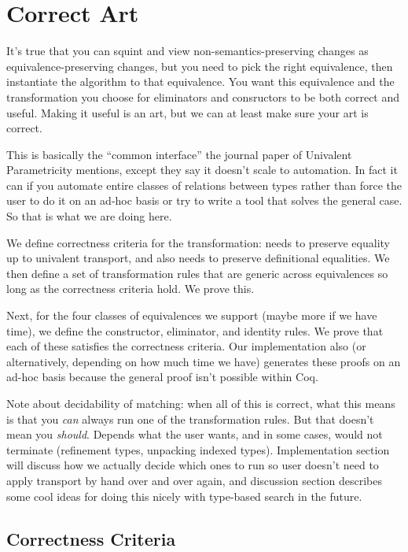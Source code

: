 \section{Correct Art}
\label{sec:meat}

It's true that you can squint and view non-semantics-preserving changes as equivalence-preserving changes,
but you need to pick the right equivalence, then instantiate the algorithm to that equivalence.
You want this equivalence and the transformation you choose for eliminators and consructors to be both correct and useful.
Making it useful is an art, but we can at least make sure your art is correct.

This is basically the ``common interface'' the journal paper of Univalent Parametricity mentions, except they say it
doesn't scale to automation. In fact it can if you automate entire classes of relations between types rather than
force the user to do it on an ad-hoc basis or try to write a tool that solves the general case. So that is what
we are doing here.

We define correctness criteria for the transformation: needs to preserve equality up to univalent transport, and also needs to
preserve definitional equalities.
We then define a set of transformation rules that are generic across equivalences so long as the correctness criteria hold.
We prove this.

Next, for the four classes of equivalences we support (maybe more if we have time), we define the constructor, eliminator, and identity rules.
We prove that each of these satisfies the correctness criteria.
Our implementation also (or alternatively, depending on how much time we have) generates these proofs on an ad-hoc basis because
the general proof isn't possible within Coq.

Note about decidability of matching: when all of this is correct, what this means is that you \textit{can} always
run one of the transformation rules. But that doesn't mean you \textit{should}. Depends what the user wants,
and in some cases, would not terminate (refinement types, unpacking indexed types). Implementation section will
discuss how we actually decide which ones to run so user doesn't need to apply transport by hand over and over again,
and discussion section describes some cool ideas for doing this nicely with type-based search in the future.

\subsection{Correctness Criteria}

